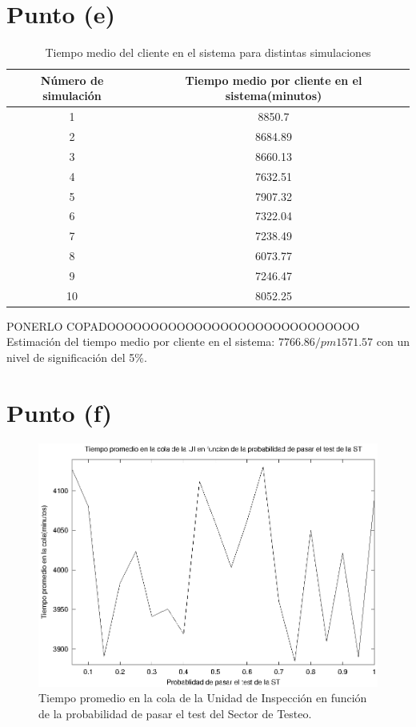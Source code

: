 \documentclass[a4paper,10pt]{article}
\begin{document}
\section{Punto (e)}

\begin{table}
\centering
\begin{tabular}{|c|c|}
\hline
  N\'umero de simulaci\'on & Tiempo medio por cliente en el sistema(minutos) \\
\hline
  1 & 8850.7 \\
\hline
  2 & 8684.89 \\
\hline
  3 & 8660.13 \\
\hline
  4 & 7632.51 \\
\hline
  5 & 7907.32 \\
\hline
  6 & 7322.04 \\
\hline
  7 & 7238.49 \\
\hline
  8 & 6073.77 \\
\hline
  9 & 7246.47 \\
\hline
  10 & 8052.25 \\
\hline
\end{tabular}
\caption{\label{tab:mean_sistem_time} Tiempo medio del cliente en el sistema para distintas simulaciones}
\end{table} 

PONERLO COPADOOOOOOOOOOOOOOOOOOOOOOOOOOOOO
Estimaci\'on del tiempo medio por cliente en el sistema: $7766.86 /pm 1571.57$ con un nivel de significaci\'on del 5\%.


\section{Punto (f)}

\begin{figure}[ht]
\begin{center}
\includegraphics[width=15cm]{./img/tp_UI.eps}
\caption{\label{fig:tp_UI} Tiempo promedio en la cola de la Unidad de Inspecci\'on en funci\'on de la probabilidad de pasar el test del Sector de Testeo.}
\end{center}
\end{figure}
\end{document}
